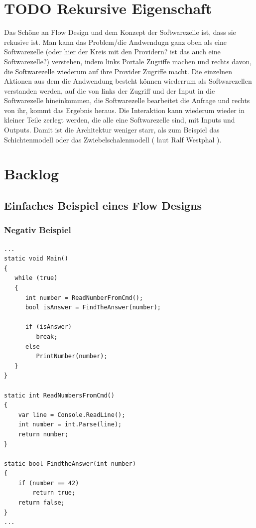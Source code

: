 \documentclass[11pt]{article}
\begin{document}
\section{{\bfseries\sffamily TODO} Rekursive Eigenschaft}
\label{sec:orgheadline81}
Das Schöne an Flow Design und dem Konzept der Softwarezelle ist, dass sie rekusive ist.
Man kann das Problem/die Andwendugn ganz oben als eine Softwarezelle (oder hier der Kreis mit den Providern? ist das auch eine Softwarezelle?)
verstehen, indem links Portale Zugriffe machen und rechts davon, die Softwarezelle wiederum auf ihre Provider Zugriffe macht.
Die einzelnen Aktionen aus dem die Andwendung besteht können wiederrum als Softwarezellen verstanden werden, auf die von links 
der Zugriff und der Input in die Softwarezelle hineinkommen, die Softwarezelle bearbeitet die Anfrage und rechts von ihr, kommt das
Ergebnis heraus. Die Interaktion kann wiederum wieder in kleiner Teile zerlegt werden, die alle eine Softwarezelle sind, mit Inputs und
Outputs. Damit ist die Architektur weniger starr, als zum Beispiel das Schichtenmodell oder das Zwiebelschalenmodell ( laut Ralf Westphal ). 



\section{Backlog}
\label{sec:orgheadline84}
\subsection{Einfaches Beispiel eines Flow Designs}
\label{sec:orgheadline83}
\subsubsection{Negativ Beispiel}
\label{sec:orgheadline82}
\begin{verbatim}
...
static void Main()
{
   while (true)
   {
      int number = ReadNumberFromCmd();
      bool isAnswer = FindTheAnswer(number);

      if (isAnswer)
         break;
      else
         PrintNumber(number);
   }
}

static int ReadNumbersFromCmd()
{
    var line = Console.ReadLine();
    int number = int.Parse(line);
    return number;
}

static bool FindtheAnswer(int number)
{ 
    if (number == 42)
        return true;
    return false;
}
...
\end{verbatim}
\end{document}
